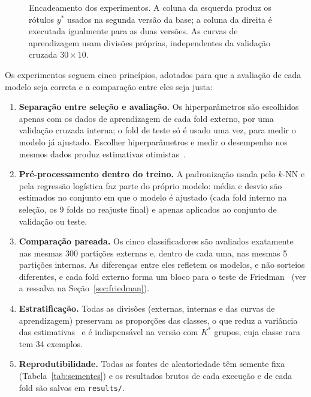 \documentclass[11pt,a4paper]{article}
\begin{document}
\begin{figure}[H]
\caption{Encadeamento dos experimentos. A coluna da esquerda produz os rótulos $y^*$ usados na segunda versão da
base; a coluna da direita é executada igualmente para as duas versões. As curvas de aprendizagem usam divisões
próprias, independentes da validação cruzada $30\times10$.}\label{fig:pipeline}
\end{figure}

Os experimentos seguem cinco princípios, adotados para que a avaliação de cada modelo seja correta e a comparação
entre eles seja justa:

\begin{enumerate}
\item \textbf{Separação entre seleção e avaliação.} Os hiperparâmetros são escolhidos apenas com os dados de
  aprendizagem de cada fold externo, por uma validação cruzada interna; o fold de teste só é usado uma vez, para
  medir o modelo já ajustado. Escolher hiperparâmetros e medir o desempenho nos mesmos dados produz estimativas
  otimistas~\cite{varma2006bias,cawley2010overfitting}.
\item \textbf{Pré-processamento dentro do treino.} A padronização usada pelo $k$-NN e pela regressão logística faz
  parte do próprio modelo: média e desvio são estimados no conjunto em que o modelo é ajustado (cada fold interno
  na seleção, os 9 folds no reajuste final) e apenas aplicados ao conjunto de validação ou teste.
\item \textbf{Comparação pareada.} Os cinco classificadores são avaliados exatamente nas mesmas 300 partições
  externas e, dentro de cada uma, nas mesmas 5 partições internas. As diferenças entre eles refletem os modelos, e
  não sorteios diferentes, e cada fold externo forma um bloco para o teste de Friedman~\cite{friedman1937ranks} (ver a ressalva na Seção~\ref{sec:friedman}).
\item \textbf{Estratificação.} Todas as divisões (externas, internas e das curvas de aprendizagem) preservam as
  proporções das classes, o que reduz a variância das estimativas~\cite{kohavi1995study} e é indispensável na
  versão com $K^*$ grupos, cuja classe rara tem 34 exemplos.
\item \textbf{Reprodutibilidade.} Todas as fontes de aleatoriedade têm semente fixa (Tabela~\ref{tab:sementes}) e
  os resultados brutos de cada execução e de cada fold são salvos em \texttt{results/}.
\end{enumerate}
\end{document}
